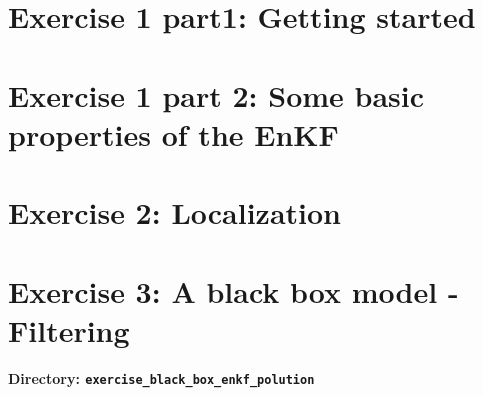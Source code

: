 \documentclass[a4paper,10pt]{article}
\begin{document}
\section{Exercise 1 part1: Getting started}


\section{Exercise 1 part 2: Some basic properties of the EnKF}


\section{Exercise 2: Localization}


\section{Exercise 3: A black box model - Filtering}

\newcommand{\opgave}{exercise\_black\_box\_enkf\_polution}
{\bf Directory: {\tt \opgave}}\\


\end{document}
